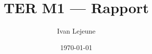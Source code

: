 


\usepackage[a4paper,hmargin=30mm,vmargin=30mm]{geometry}

\title{\color{astral} \sffamily \bfseries TER M1 --- Rapport}
\author{Ivan Lejeune}
\date{\today}


    \maketitle
    \tableofcontents

    \newpage
    
    




